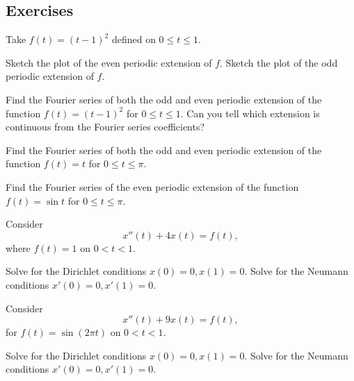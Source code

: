 \subsection{Exercises}

\begin{exercise}
Take $f(t) = {(t-1)}^2$ defined on $0 \leq t \leq 1$.
\begin{tasks}
\task Sketch the plot of the even periodic extension of $f$.
\task Sketch the plot of the odd periodic extension of $f$.
\end{tasks}
\end{exercise}

\begin{exercise}
Find the Fourier series of both the odd and even
periodic extension of 
the function $f(t) = {(t-1)}^2$ for $0 \leq t \leq 1$.
Can you tell which extension is continuous from the Fourier series
coefficients?
\end{exercise}

\begin{exercise}
Find the Fourier series of both the odd and even periodic extension of 
the function $f(t) = t$ for $0 \leq t \leq \pi$.
\end{exercise}

\begin{exercise}
Find the Fourier series of the even periodic extension of 
the function $f(t) = \sin t$ for $0 \leq t \leq \pi$.
\end{exercise}

\begin{exercise}
\pagebreak[2]
Consider
\begin{equation*}
x''(t) + 4 x(t) = f(t) ,
\end{equation*}
where $f(t) = 1$ on $0 < t < 1$.
\begin{tasks}
\task Solve for the Dirichlet conditions $x(0)=0, x(1) = 0$.
\task Solve for the Neumann conditions $x'(0)=0, x'(1) = 0$.
\end{tasks}
\end{exercise}

\begin{exercise}
Consider
\begin{equation*}
x''(t) + 9 x(t) = f(t) ,
\end{equation*}
for $f(t) = \sin (2\pi t)$ on $0 < t < 1$.
\begin{tasks}
\task Solve for the Dirichlet conditions $x(0)=0, x(1) = 0$.
\task Solve for the Neumann conditions $x'(0)=0, x'(1) = 0$.
\end{tasks}
\end{exercise}

